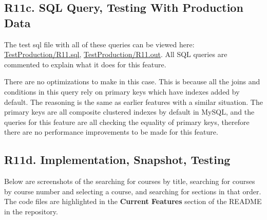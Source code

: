 \documentclass[12pt, a4paper]{article}
\begin{document}
\subsection*{R11c. SQL Query, Testing With Production Data}
The test sql file with all of these queries can be viewed here: \underline{\href{https://github.com/Kggupta/DegreeMap/tree/main/Database/Queries/TestProduction}{TestProduction/R11.sql}}, \underline{\href{https://github.com/Kggupta/DegreeMap/tree/main/Database/Queries/TestProduction}{TestProduction/R11.out}}. All SQL queries are commented to explain what it does for this feature.

There are no optimizations to make in this case. This is because all the joins and conditions in this query rely on primary keys which have indexes added by default. The reasoning is the same as earlier features with a similar situation. The primary keys are all composite clustered indexes by default in MySQL, and the queries for this feature are all checking the equality of primary keys, therefore there are no performance improvements to be made for this feature. 

\subsection*{R11d. Implementation, Snapshot, Testing}
Below are screenshots of the searching for courses by title, searching for courses by course number and selecting a course, and searching for sections in that order. The code files are highlighted in the \textbf{Current Features} section of the README in the repository.
\end{document}
